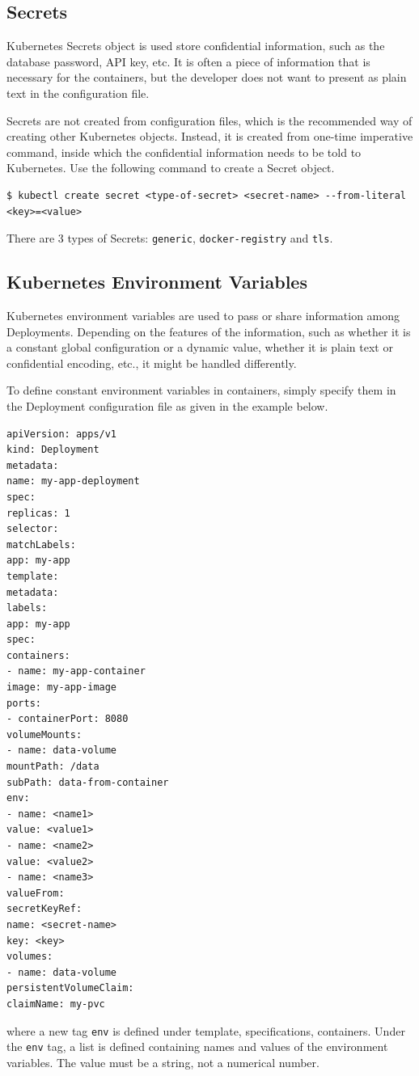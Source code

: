 \subsection{Secrets} \label{ch:vac:subsec:k8ssecrets}

Kubernetes Secrets object is used store confidential information, such as the database password, API key, etc. It is often a piece of information that is necessary for the containers, but the developer does not want to present as plain text in the configuration file.

Secrets are not created from configuration files, which is the recommended way of creating other Kubernetes objects. Instead, it is created from one-time imperative command, inside which the confidential information needs to be told to Kubernetes. Use the following command to create a Secret object.
\begin{lstlisting}
$ kubectl create secret <type-of-secret> <secret-name> --from-literal <key>=<value>
\end{lstlisting}
There are 3 types of Secrets: \verb|generic|, \verb|docker-registry| and \verb|tls|.

\subsection{Kubernetes Environment Variables}

Kubernetes environment variables are used to pass or share information among Deployments. Depending on the features of the information, such as whether it is a constant global configuration or a dynamic value, whether it is plain text or confidential encoding, etc., it might be handled differently.

To define constant environment variables in containers, simply specify them in the Deployment configuration file as given in the example below.

\begin{lstlisting}
apiVersion: apps/v1
kind: Deployment
metadata:
name: my-app-deployment
spec:
replicas: 1
selector:
matchLabels:
app: my-app
template:
metadata:
labels:
app: my-app
spec:
containers:
- name: my-app-container
image: my-app-image
ports:
- containerPort: 8080
volumeMounts:
- name: data-volume
mountPath: /data
subPath: data-from-container
env:
- name: <name1>
value: <value1>
- name: <name2>
value: <value2>
- name: <name3>
valueFrom:
secretKeyRef:
name: <secret-name>
key: <key>
volumes:
- name: data-volume
persistentVolumeClaim:
claimName: my-pvc
\end{lstlisting}
where a new tag \verb|env| is defined under template, specifications, containers. Under the \verb|env| tag, a list is defined containing names and values of the environment variables. The value must be a string, not a numerical number.


